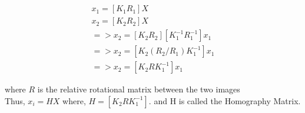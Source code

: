 \documentclass{article}[11pt]
\begin{document}
\begin{eqnarray*}
\\ x_1 = [K_1R_1]X 
\\ x_2 = [K_2R_2]X
\\ =>  x_2 = [K_2R_2][K_1^{-1}R_1^{-1}]x_1
\\    => x_2 = [K_2(R_2/R_1)K_1^{-1}]x_1
\\    => x_2 =  [K_2RK_1^{-1}]x_1
\end{eqnarray*}

where $R$ is the relative rotational matrix between the two images
\\

Thus, $x_{i} = H X$ where, $H=  [K_2RK_1^{-1}]$. and H is called the Homography Matrix.
\end{document}

